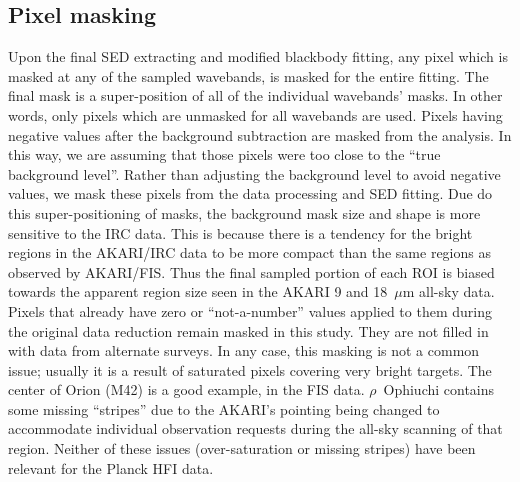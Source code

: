 \subsection{Pixel masking}
     Upon the final SED extracting and modified blackbody fitting, any pixel which is masked at any of the sampled wavebands, is masked for the entire fitting. The final mask is a super-position of all of the individual wavebands’ masks. In other words, only pixels which are unmasked for all wavebands are used. 
     Pixels having negative values after the background subtraction are masked from the analysis. In this way, we are assuming that those pixels were too close to the ``true background level”. Rather than adjusting the background level to avoid negative values, we mask these pixels from the data processing and SED fitting. 
     Due do this super-positioning of masks, the background mask size and shape is more sensitive to the IRC data. This is because there is a tendency for the bright regions in the AKARI/IRC data to be more compact than the same regions as observed by AKARI/FIS. Thus the final sampled portion of each ROI is biased towards the apparent region size seen in the AKARI 9 and 18~$\mu$m all-sky data.          
     Pixels that already have zero or ``not-a-number” values applied to them during the original data reduction remain masked in this study. They are not filled in with data from alternate surveys. In any case, this masking is not a common issue; usually it is a result of saturated pixels covering very bright targets. The center of Orion (M42) is a good example, in the FIS data. $\rho$~Ophiuchi contains some missing ``stripes” due to the AKARI’s pointing being changed to accommodate individual observation requests during the all-sky scanning of that region. Neither of these issues (over-saturation or missing stripes) have been relevant for the Planck HFI data. 
